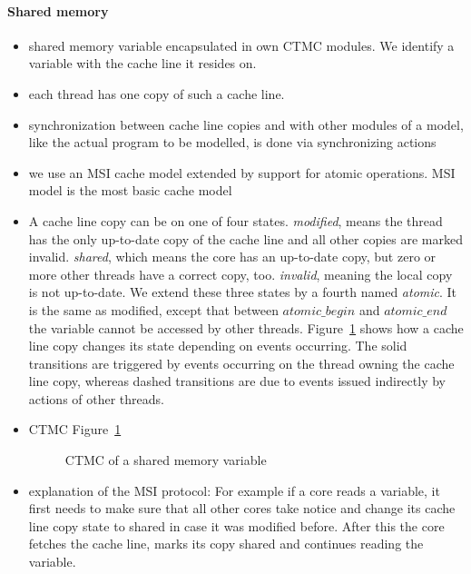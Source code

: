 \documentclass[a4paper, 10pt]{article}
\begin{document}
\begin{enumerate}
\paragraph{Shared memory}
\label{sssec:analysis-modelchecking-modelling-shared-memory}
\begin{itemize}
	\item shared memory variable encapsulated in own CTMC modules. We identify a variable with the cache line it resides on.
	\item each thread has one copy of such a cache line.
	\item synchronization between cache line copies and with other modules of a model, like the actual program to be modelled, is done via synchronizing actions
	\item we use an MSI cache model extended by support for atomic operations. MSI model is the most basic cache model
	\item A cache line copy can be on one of four states. \emph{modified}, means the thread has the only up-to-date copy of the cache line and all other copies are marked invalid. \emph{shared}, which means the core has an up-to-date copy, but zero or more other threads have a correct copy, too. \emph{invalid}, meaning the local copy is not up-to-date. We extend these three states by a fourth named \emph{atomic}. It is the same as modified, except that between $\mathit{atomic\_begin}$ and $\mathit{atomic\_end}$ the variable cannot be accessed by other threads. Figure~\ref{fig:shared-memory-control-flow} shows how a cache line copy changes its state depending on events occurring. The solid transitions are triggered by events occurring on the thread owning the cache line copy, whereas dashed transitions are due to events issued indirectly by actions of other threads.
	\item CTMC Figure~\ref{fig:shared-memory-control-flow}
		\begin{figure}[htbp]
			\centering
			
			\caption{CTMC of a shared memory variable}
			\label{fig:shared-memory-control-flow}
		\end{figure}
	\item explanation of the MSI protocol: For example if a core reads a variable, it first needs to make sure that all other cores take notice and change its cache line copy state to shared in case it was modified before. After this the core fetches the cache line, marks its copy shared and continues reading the variable.

\end{itemize}
\end{enumerate}
\end{document}
